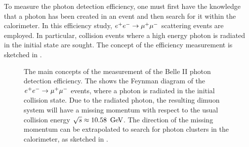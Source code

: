 To measure the photon detection efficiency, one must first have the knowledge that a photon has been created in an event and then search for it within the calorimeter.
In this efficiency study, $e^+e^-\rightarrow\mu^+\mu^-$ scattering events are employed.
In particular, collision events where a high energy photon is radiated in the initial state are sought.
The concept of the efficiency measurement is sketched in .
\begin{figure}[htbp!]
    \centering
    \caption{\label{fig:photon_efficiency_measurement} The main concepts of the measurement of the Belle II photon detection efficiency.
    The  shows the Feynman diagram of the $e^+e^-\rightarrow\mu^+\mu^-$ events, where a photon is radiated in the initial collision state.
    Due to the radiated photon, the resulting dimuon system will have a missing momentum with respect to the usual collision energy $\sqrt{s}\approx10.58~\mathrm{\,Ge\kern -0.1em V}$.
    The direction of the missing momentum can be extrapolated to search for photon clusters in the calorimeter, as sketched in .
    }
\end{figure}

